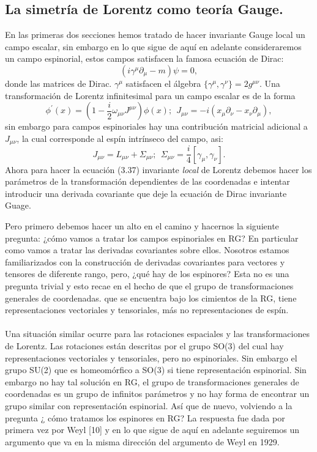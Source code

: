 \subsection{La simetría de Lorentz como teoría Gauge.}
En las primeras dos secciones hemos tratado de hacer invariante Gauge local un campo escalar, sin embargo en lo que sigue de aquí en adelante consideraremos un campo espinorial, estos campos satisfacen la famosa ecuación de Dirac:
\begin{equation}
(i\gamma^\mu\partial_\mu-m)\psi=0,
\end{equation}		
donde las matrices de Dirac. $\gamma^\mu$ satisfacen el álgebra $\{\gamma^\mu,\gamma^\nu\}=2g^{\mu\nu}$. Una transformación de Lorentz infinitesimal para un campo escalar es de la forma 
\begin{equation}
\phi^\prime(x)=\left(1-\frac{i}{2}\omega_{\mu\nu}J^{\mu\nu}\right)\phi(x);\ \ J_{\mu\nu}=-i(x_\mu\partial_\nu-x_\nu\partial_\mu) ,
\end{equation} 
sin embargo para campos espinoriales hay una contribución matricial adicional a $J_{\mu\nu}$, la cual corresponde al espín intrínseco del campo, asi:
\begin{equation}
J_{\mu\nu}=L_{\mu\nu}+\Sigma_{\mu\nu};\ \ \Sigma_{\mu\nu}=\frac{i}{4}[\gamma_\mu,\gamma_\nu] .
\end{equation}
Ahora para hacer la ecuación (3.37) invariante \textit{local} de Lorentz debemos hacer los parámetros de la transformación dependientes de las coordenadas e intentar introducir una derivada covariante que deje la ecuación de Dirac invariante Guage.

Pero primero debemos hacer un alto en el camino y hacernos la siguiente pregunta: ¿cómo vamos a tratar los campos espinoriales en RG? En particular como vamos a tratar las derivadas covariantes sobre ellos. Nosotros estamos familiarizados con la construcción de derivadas covariantes para vectores y tensores de diferente rango, pero, ¿qué hay de los espinores? Esta no es una pregunta trivial y esto recae en el hecho de que el grupo de transformaciones generales de coordenadas. que se encuentra bajo los cimientos de la RG, tiene representaciones vectoriales y tensoriales, más no representaciones de espín.
\\
\\
Una situación similar ocurre para las rotaciones espaciales y las transformaciones de Lorentz. Las rotaciones están descritas por el grupo SO(3) del cual hay representaciones vectoriales y tensoriales, pero no espinoriales. Sin embargo el grupo SU(2) que es homeomórfico a SO(3) si tiene representación espinorial. Sin embargo no hay tal solución en RG, el grupo de transformaciones generales de coordenadas es un grupo de infinitos parámetros y no hay forma de encontrar un grupo similar con representación espinorial. Así que de nuevo, volviendo a la pregunta ¿ cómo tratamos los espinores en RG? La respuesta fue dada por primera vez por Weyl [10] y en lo que sigue de aquí en adelante seguiremos un argumento que va en la misma dirección del argumento de Weyl en 1929. 

